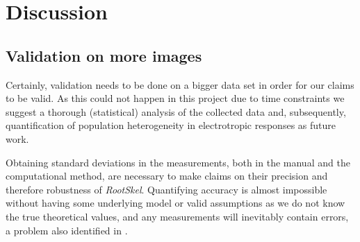 
\chapter{Discussion} %

\label{discussion} %

%





\section{Validation on more images}\label{sec:validation}


Certainly, validation needs to be done on a bigger data set in order for our claims to be valid.
As this could not happen in this project due to time constraints we suggest a thorough (statistical) analysis of the collected data and, subsequently, quantification of population heterogeneity in electrotropic responses as future work.

Obtaining standard deviations in the measurements, both in the manual and the computational method, are necessary to make claims on their precision and therefore robustness of \textit{RootSkel}. Quantifying accuracy is almost impossible without having some underlying model or valid assumptions as we do not know the true theoretical values, and any measurements will inevitably contain errors, a problem also identified in \cite{dee2015image}.

